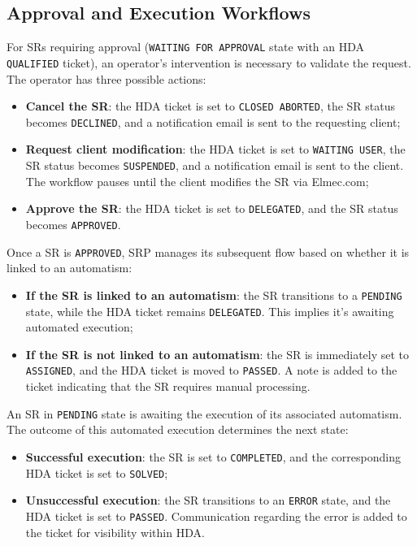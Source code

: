 \subsection{Approval and Execution Workflows}
For SRs requiring approval (\texttt{WAITING FOR APPROVAL} state with an HDA \texttt{QUALIFIED} ticket), an operator's intervention is necessary to validate the request. The operator has three possible actions:
\begin{itemize}
    \item \textbf{Cancel the SR}: the HDA ticket is set to \texttt{CLOSED ABORTED}, the SR status becomes \texttt{DECLINED}, and a notification email is sent to the requesting client;
    \item \textbf{Request client modification}: the HDA ticket is set to \texttt{WAITING USER}, the SR status becomes \texttt{SUSPENDED}, and a notification email is sent to the client. The workflow pauses until the client modifies the SR via Elmec.com;
    \item \textbf{Approve the SR}: the HDA ticket is set to \texttt{DELEGATED}, and the SR status becomes \texttt{APPROVED}.
\end{itemize}

Once a SR is \texttt{APPROVED}, SRP manages its subsequent flow based on whether it is linked to an automatism:
\begin{itemize}
    \item \textbf{If the SR is linked to an automatism}: the SR transitions to a \texttt{PENDING} state, while the HDA ticket remains \texttt{DELEGATED}. This implies it's awaiting automated execution;
    \item \textbf{If the SR is not linked to an automatism}: the SR is immediately set to \texttt{ASSIGNED}, and the HDA ticket is moved to \texttt{PASSED}. A note is added to the ticket indicating that the SR requires manual processing.
\end{itemize}

An SR in \texttt{PENDING} state is awaiting the execution of its associated automatism. The outcome of this automated execution determines the next state:
\begin{itemize}
    \item \textbf{Successful execution}: the SR is set to \texttt{COMPLETED}, and the corresponding HDA ticket is set to \texttt{SOLVED};
    \item \textbf{Unsuccessful execution}: the SR transitions to an \texttt{ERROR} state, and the HDA ticket is set to \texttt{PASSED}. Communication regarding the error is added to the ticket for visibility within HDA.
\end{itemize}

